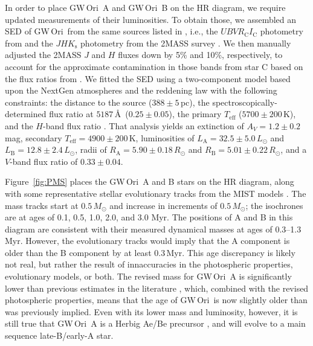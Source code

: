 \documentclass[twocolumn]{aastex61}
\newcommand{\obj}{GW\,Ori}
\begin{document}
In order to place \obj~A and \obj~B on the HR diagram, we require updated measurements of their luminosities. To obtain those, we assembled an SED of \obj\ from the same sources listed in \citet{fang14}, i.e., the $U B V R_\mathrm{C} I_\mathrm{C}$ photometry from \citet{calvet04} and the $JHK_\mathrm{s}$ photometry from the 2MASS survey \citep{skrutskie06}. We then manually adjusted the 2MASS $J$ and $H$ fluxes down by 5\% and 10\%, respectively, to account for the approximate contamination in those bands from star C based on the flux ratios from \citet{berger11}. We fitted the SED using a two-component model based upon the NextGen atmospheres \citep{hauschildt99} and the \citet{cardelli89} reddening law with the following constraints: the distance to the source ($388\pm 5$\,pc), the spectroscopically-determined flux ratio at $5187$\,\AA\ ($0.25 \pm 0.05$), the primary $T_\mathrm{eff}$ ($5700\pm 200$\,K), and the $H$-band flux ratio \citep[$f_\mathrm{B} / f_\mathrm{A} = 0.57 \pm 0.05$;][]{berger11}. That analysis yields an extinction of $A_V = 1.2 \pm 0.2$\,mag, secondary $T_\mathrm{eff} = 4900 \pm 200$\,K, luminosities of $L_\mathrm{A} = 32.5 \pm 5.0\,L_\odot$ and $L_\mathrm{B} = 12.8 \pm 2.4\,L_\odot$, radii of $R_\mathrm{A} = 5.90 \pm 0.18\,R_\odot$ and $R_\mathrm{B} = 5.01 \pm 0.22\,R_\odot$, and a $V$-band flux ratio of $0.33\pm0.04$.

Figure~\ref{fig:PMS} places the \obj\ A and B stars on the HR diagram, along with some representative stellar evolutionary tracks from the MIST models \citep{choi16}. The mass tracks start at $0.5\,M_\odot$ and increase in increments of $0.5\,M_\odot$; the isochrones are at ages of 0.1, 0.5, 1.0, 2.0, and 3.0 Myr. The positions of A and B in this diagram are consistent with their measured dynamical masses at ages of 0.3--1.3 Myr. However, the evolutionary tracks would imply that the A component is older than the B component by at least 0.3\,Myr. This age discrepancy is likely not real, but rather the result of innaccuracies in the photospheric properties, evolutionary models, or both. The revised mass for \obj~A is significantly lower than previous estimates in the literature \citep{berger11,fang14}, which, combined with the revised photospheric properties, means that the age of \obj\ is now slightly older than was previously implied. Even with its lower mass and luminosity, however, it is still true that \obj~A is a Herbig Ae/Be precursor \citep[as was also noted by][]{fang14}, and will evolve to a main sequence late-B/early-A star.
\end{document}
